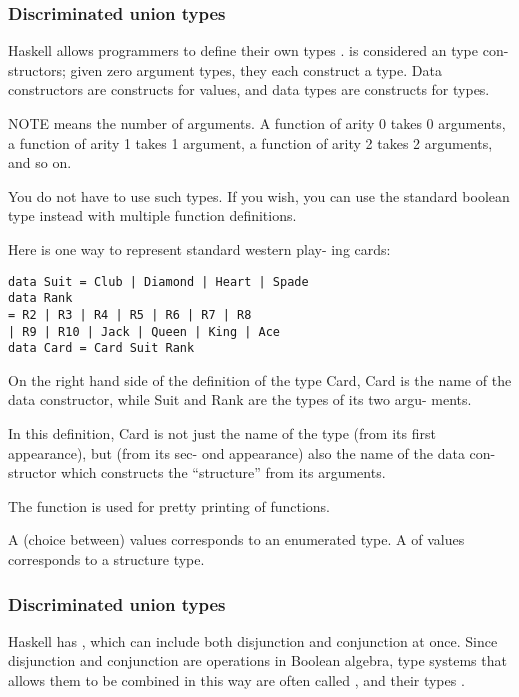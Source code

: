 \subsubsection{Discriminated union types}
Haskell allows programmers
to define their own types . 
 is considered an  type con-
structors; given zero argument types, they each
construct a type. Data constructors are constructs for values, and data types are constructs for types.

NOTE  means the number of arguments. A
function of arity 0 takes 0 arguments, a function
of arity 1 takes 1 argument, a function of arity 2
takes 2 arguments, and so on. 

You do not have to use such types. If you wish,
you can use the standard boolean type instead with multiple function definitions.

Here is one way to represent standard western play-
ing cards:
\begin{lstlisting}
data Suit = Club | Diamond | Heart | Spade
data Rank
= R2 | R3 | R4 | R5 | R6 | R7 | R8
| R9 | R10 | Jack | Queen | King | Ace
data Card = Card Suit Rank
\end{lstlisting}
On the right hand side of the definition of the type
Card, Card is the name of the data constructor,
while Suit and Rank are the types of its two argu-
ments.

In this definition, Card is not just the name of the
type (from its first appearance), but (from its sec-
ond appearance) also the name of the data con-
structor which constructs the “structure” from its
arguments.

The function  is used for pretty printing of functions.

A  (choice between) values
corresponds to an enumerated type.
A  of values corresponds to a structure type.

\subsubsection{Discriminated union types}
Haskell has , which can
include both disjunction and conjunction at once.
Since disjunction and conjunction are operations in
Boolean algebra, type systems that allows them to
be combined in this way are often called , and their types .

